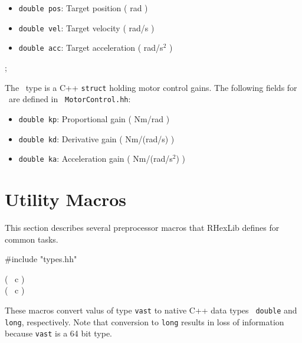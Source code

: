\begin{itemize}
\item{{\tt double pos}: Target position ( rad )}
\item{{\tt double vel}: Target velocity ( rad/s )}
\item{{\tt double acc}: Target acceleration ( rad/s$^2$ )}
\end{itemize}

\begin{datatype}
\typedefcmd{\motorgains}; \\
\end{datatype}

The \motorgains\ type is a C++ {\tt struct} holding motor control
gains. The following fields for \motorgains\ are defined in {\tt
MotorControl.hh}:

\begin{itemize}
\item{{\tt double kp}: Proportional gain ( Nm/rad )}
\item{{\tt double kd}: Derivative gain ( Nm/(rad/s) )}
\item{{\tt double ka}: Acceleration gain ( Nm/(rad/s$^2$) )}
\end{itemize}

\section{Utility Macros} 
\label{sec:utility_macros}

This section describes several preprocessor macros that RHexLib defines for
common tasks.

\begin{codesegment}
#include "types.hh"
\end{codesegment}

\begin{datatype}
\VastToDouble( \CLOCK\ c ) \\
\VastToLong( \CLOCK\ c ) \\
\end{datatype}

These macros convert valus of type {\tt vast} to native C++ data types {\tt
  double} and {\tt long}, respectively. Note that conversion to {\tt long}
results in loss of information because {\tt vast} is a 64 bit type.

\begin{datatype}
\ClocksPerSec \\
\end{datatype}

